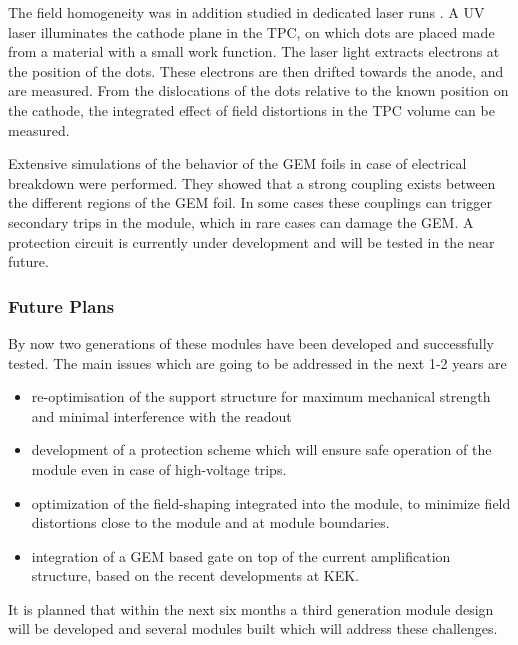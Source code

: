 The field homogeneity was in addition studied in dedicated laser runs \cite{Zenker:2014qra}. A UV laser illuminates the cathode plane in the TPC, on which dots are placed made from a material with a small work function. The laser light extracts electrons at the position of the dots. These electrons are then drifted towards the anode, and are measured. From the dislocations of the dots relative to the known position on the cathode, the integrated effect of field distortions in the TPC volume can be measured.

Extensive simulations of the behavior of the GEM foils in case of electrical breakdown were performed. They showed that a strong coupling exists between the different regions of the GEM foil. In some cases these couplings can trigger secondary trips in the module, which in rare cases can damage the GEM. A protection circuit is currently under development and will be tested in the near future.

\subsubsection{Future Plans}

By now two generations of these modules have been developed and successfully tested. The main issues which are going to be addressed in the next 1-2 years are
\begin{itemize}
\item re-optimisation of the support structure for maximum mechanical strength and minimal interference with the readout
\item development of a protection scheme which will ensure safe operation of the module even in case of high-voltage trips.
\item optimization of the field-shaping integrated into the module, to minimize field distortions close to the module and at module boundaries.
\item integration of a GEM based gate on top of the current amplification structure, based on the recent developments at KEK.
\end{itemize}
It is planned that within the next six months a third generation module design will be developed and several modules built which will address these challenges.

